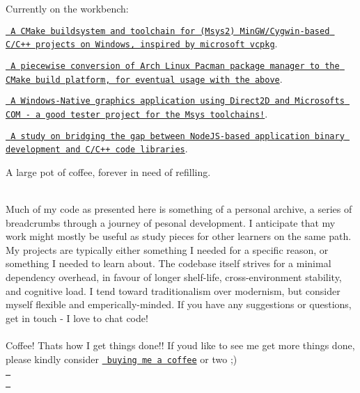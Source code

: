 \begin{longtabu}
Currently on the workbench\+:




\begin{DoxyItemize}
\item \href{https://github.com/StoneyDSP/MSYS2-toolchain.git}{\texttt{ A CMake buildsystem and toolchain for (Msys2) Min\+GW/\+Cygwin-\/based C/\+C++ projects on Windows, inspired by microsoft vcpkg}}.
\item \href{https://github.com/StoneyDSP/MSYS2-pacman.git}{\texttt{ A piecewise conversion of Arch Linux Pacman package manager to the CMake build platform, for eventual usage with the above}}.
\item \href{https://github.com/StoneyDSP/CxxWin.git}{\texttt{ A Windows-\/\+Native graphics application using Direct2D and Microsoft\textquotesingle{}s COM -\/ a good tester project for the Msys toolchains!}}.
\item \href{https://github.com/cmodules/cmodules}{\texttt{ A study on bridging the gap between Node\+JS-\/based application binary development and C/\+C++ code libraries}}.
\item A large pot of coffee, forever in need of refilling.
\end{DoxyItemize}

\\
\PBS\centering Much of my code as presented here is something of a personal archive, a series of breadcrumbs through a journey of pesonal development. I anticipate that my work might mostly be useful as study pieces for other learners on the same path. My projects are typically either something I needed for a specific reason, or something I needed to learn about. The codebase itself strives for a minimal dependency overhead, in favour of longer shelf-\/life, cross-\/environment stability, and cognitive load. I tend toward traditionalism over modernism, but consider myself flexible and emperically-\/minded. If you have any suggestions or questions, get in touch -\/ I love to chat code!    \\
\PBS\centering \\
\PBS\centering Coffee! That\textquotesingle{}s how I get things done!! If you\textquotesingle{}d like to see me get more things done, please kindly consider \href{https://www.patreon.com/bePatron?u=8549187}{\texttt{ buying me a coffee}} or two ;)    \\
\PBS\centering \href{https://paypal.me/StoneyDSPAudio?country.x=ES&locale.x=en_US}{\texttt{ }}    \\
\PBS\centering \href{https://www.patreon.com/bePatron?u=8549187}{\texttt{ }}   \\
\end{longtabu}
